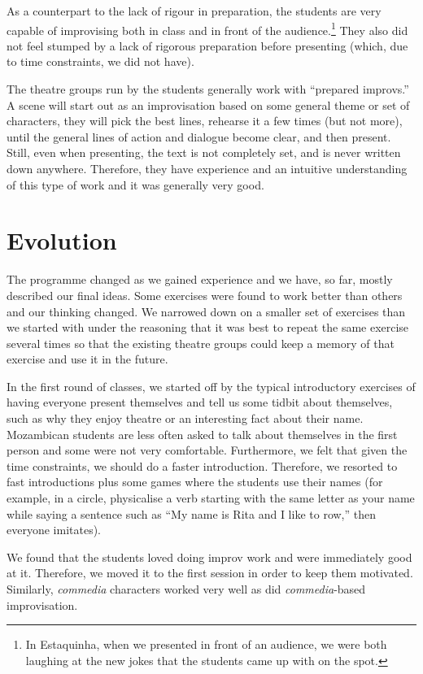 \documentclass[article,twocolumn,twoside]{memoir}
\begin{document}
As a counterpart to the lack of rigour in preparation, the students are
very capable of improvising both in class and in front of the
audience.\footnote{In Estaquinha, when we presented in front of an audience, we
were both laughing at the new jokes that the students came up with on the
spot.} They also did not feel stumped by a lack of rigorous preparation before
presenting (which, due to time constraints, we did not have).

The theatre groups run by the students generally work with ``prepared
improvs.'' A scene will start out as an improvisation based on some general
theme or set of characters, they will pick the best lines, rehearse it a few
times (but not more), until the general lines of action and dialogue become
clear, and then present. Still, even when presenting, the text is not
completely set, and is never written down anywhere. Therefore, they have
experience and an intuitive understanding of this type of work and it was
generally very good.

\chapter{Evolution}

The programme changed as we gained experience and we have, so far, mostly
described our final ideas. Some exercises were found to work better than others
and our thinking changed. We narrowed down on a smaller set of exercises than
we started with under the reasoning that it was best to repeat the same
exercise several times so that the existing theatre groups could keep a memory
of that exercise and use it in the future.

In the first round of classes, we started off by the typical introductory
exercises of having everyone present themselves and tell us some tidbit about
themselves, such as why they enjoy theatre or an interesting fact about their
name. Mozambican students are less often asked to talk about themselves in the
first person and some were not very comfortable. Furthermore, we felt that
given the time constraints, we should do a faster introduction. Therefore, we
resorted to fast introductions plus some games where the students use their
names (for example, in a circle, physicalise a verb starting with the same
letter as your name while saying a sentence such as ``My name is Rita and I
like to row,'' then everyone imitates).

We found that the students loved doing improv work and were immediately
good at it. Therefore, we moved it to the first session in order to keep them
motivated. Similarly, \textit{commedia} characters worked very well as did
\textit{commedia}-based improvisation.
\end{document}
